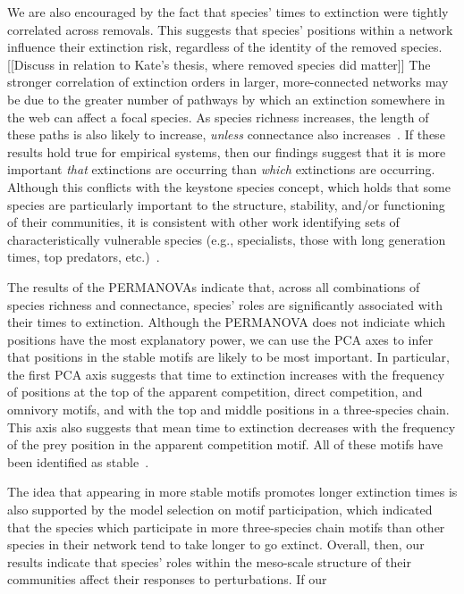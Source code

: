 \documentclass[12pt]{article}
\begin{document}
	We are also encouraged by the fact that species' times to extinction were tightly correlated across removals. This suggests that species' positions within a network influence their extinction risk, regardless of the identity of the removed species.  [[Discuss in relation to Kate's thesis, where removed species did matter]] The stronger correlation of extinction orders in larger, more-connected networks may be due to the greater number of pathways by which an extinction somewhere in the web can affect a focal species. As species richness increases, the length of these paths is also likely to increase, \emph{unless} connectance also increases~\citep{}. If these results hold true for empirical systems, then our findings suggest that it is more important \emph{that} extinctions are occurring than \emph{which} extinctions are occurring. Although this conflicts with the keystone species concept, which holds that some species are particularly important to the structure, stability, and/or functioning of their communities, it is consistent with other work identifying sets of characteristically vulnerable species (e.g., specialists, those with long generation times, top predators, etc.)~\citep{}.


	The results of the PERMANOVAs indicate that, across all combinations of species richness and connectance, species' roles are significantly associated with their times to extinction. Although the PERMANOVA does not indiciate which positions have the most explanatory power, we can use the PCA axes to infer that positions in the stable motifs are likely to be most important. In particular, the first PCA axis suggests that time to extinction increases with the frequency of positions at the top of the apparent competition, direct competition, and omnivory motifs, and with the top and middle positions in a three-species chain. This axis also suggests that mean time to extinction decreases with the frequency of the prey position in the apparent competition motif. All of these motifs have been identified as stable~\citep{Stouffer2007,Borrelli2015a}.

	
	The idea that appearing in more stable motifs promotes longer extinction times is also supported by the model selection on motif participation, which indicated that the species which participate in more three-species chain motifs than other species in their network tend to take longer to go extinct. Overall, then, our results indicate that species' roles within the meso-scale structure of their communities affect their responses to perturbations. If our 
\end{document}
